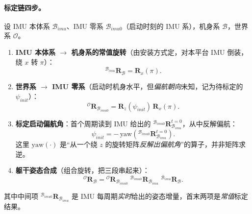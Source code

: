 \paragraph{标定链四步。}
设 IMU 本体系 $\mathcal{B}_{imu}$、IMU 零系 $\mathcal{B}_{imu0}$（启动时刻的 IMU 系），机身系 $\mathcal{B}$，世界系 $\mathcal{O}$。
\begin{enumerate}
  \item \textbf{IMU 本体系 $\to$ 机身系的常值旋转}（由安装方式定，对本平台 IMU 倒装，绕 $x$ 转 $\pi$）\cite{yu2021quadruped}：
  \begin{equation}
    {}^{\mathcal{B}_{imu}}\mathbf{R}_{\mathcal{B}} = \mathbf{R}_x(\pi).
    \label{eq:qe-imu-mount}
  \end{equation}
  \item \textbf{世界系 $\to$ IMU 零系}（启动时机身水平，但\emph{偏航朝向}未知，记为待标定的 $\psi_{init}$）\cite{yu2021quadruped}：
  \begin{equation}
    {}^{\mathcal{O}}\mathbf{R}_{\mathcal{B}_{imu0}} = \mathbf{R}_z(\psi_{init})\,\mathbf{R}_x(\pi).
    \label{eq:qe-imu-init}
  \end{equation}
  \item \textbf{标定启动偏航角}：首个周期读到 IMU 给出的 ${}^{\mathcal{B}_{imu0}}\mathbf{R}_{\mathcal{B}_{imu}}^{t=0}$，从中反解偏航\cite{yu2021quadruped}：
  \begin{equation}
    \psi_{init} = -\,\mathrm{yaw}\!\left({}^{\mathcal{B}_{imu0}}\mathbf{R}_{\mathcal{B}_{imu}}^{t=0}\right).
    \label{eq:qe-psi-init}
  \end{equation}
  这里 $\mathrm{yaw}(\cdot)$ 是“从一个绕 $z$ 的旋转矩阵\emph{反解出偏航角}”的算子，并非矩阵求逆。
  \item \textbf{躯干姿态合成}（组合旋转，把三段串起来）\cite{yu2021quadruped}：
  \begin{equation}
    \boxed{\;{}^{\mathcal{O}}\mathbf{R}_{\mathcal{B}} = {}^{\mathcal{O}}\mathbf{R}_{\mathcal{B}_{imu0}}\;{}^{\mathcal{B}_{imu0}}\mathbf{R}_{\mathcal{B}_{imu}}\;{}^{\mathcal{B}_{imu}}\mathbf{R}_{\mathcal{B}}.\;}
    \label{eq:qe-att-compose}
  \end{equation}
\end{enumerate}
其中中间项 ${}^{\mathcal{B}_{imu0}}\mathbf{R}_{\mathcal{B}_{imu}}$ 是 IMU 每周期\emph{实时}给出的姿态增量，首末两项是\emph{常值}标定结果。

